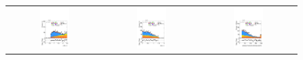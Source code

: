 \begin{figure}[htbp]
  \centering
  \setlength{\tabcolsep}{1.5pt}
  \renewcommand{\arraystretch}{0}

  \begin{tabular}{@{}c c c@{}}
    \includegraphics[width=0.33\textwidth]{images/plots_modelling_run2_run3_variables/run_2_tth/plot_ditau_dr_hh_tth_15_16_17_18.pdf} &
    \includegraphics[width=0.33\textwidth]{images/plots_modelling_run2_run3_variables/run_2_tth/plot_ditau_deta_hh_tth_15_16_17_18.pdf} &
    \includegraphics[width=0.33\textwidth]{images/plots_modelling_run2_run3_variables/run_2_tth/plot_met_reco_et_hh_tth_15_16_17_18.pdf} \\[4pt]

\end{tabular}
\end{figure}
